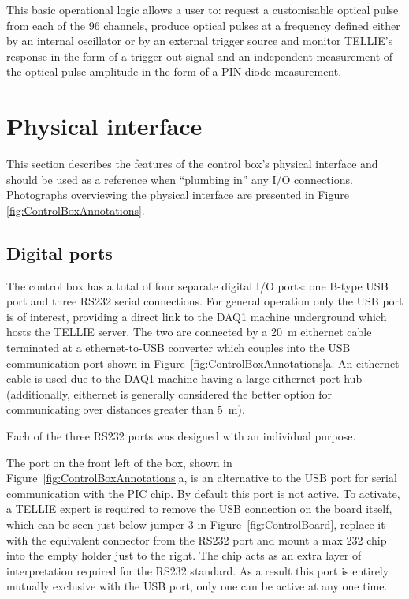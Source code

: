 \documentclass[12pt]{report}
\begin{document}
This basic operational logic allows a user to: request a customisable optical pulse from each of the 96 channels, produce optical pulses at a frequency defined either by an internal oscillator or by an external trigger source and monitor TELLIE's response in the form of a trigger out signal and an independent measurement of the optical pulse amplitude in the form of a PIN diode measurement. 

\section{Physical interface}
\label{sec:ControlBoxInterface}
This section describes the features of the control box's physical interface and should be used as a reference when ``plumbing in'' any I/O connections. Photographs overviewing the physical interface are presented in Figure \ref{fig:ControlBoxAnnotations}. 

\subsection{Digital ports}
The control box has a total of four separate digital I/O ports: one B-type USB port and three RS232 serial connections. For general operation only the USB port is of interest, providing a direct link to the DAQ1 machine underground which hosts the TELLIE server. The two are connected by a 20~m eithernet cable terminated at a ethernet-to-USB converter which couples into the USB communication port shown in Figure~\ref{fig:ControlBoxAnnotations}a. An eithernet cable is used due to the DAQ1 machine having a large eithernet port hub (additionally, eithernet is generally considered the better option for communicating over distances greater than 5~m).

Each of the three RS232 ports was designed with an individual purpose.

	The port on the front left of the box, shown in Figure~\ref{fig:ControlBoxAnnotations}a, is an alternative to the USB port for serial communication with the PIC chip. By default this port is not active. To activate, a TELLIE expert is required to remove the USB connection on the board itself, which can be seen just below jumper 3 in Figure~\ref{fig:ControlBoard}, replace it with the equivalent connector from the RS232 port and mount a max 232 chip into the empty holder just to the right. The chip acts as an extra layer of interpretation required for the RS232 standard. As a result this port is entirely mutually exclusive with the USB port, only one can be active at any one time.
\end{document}
